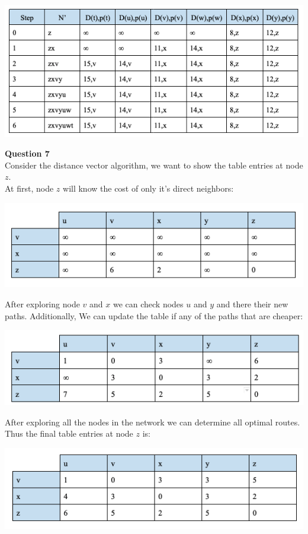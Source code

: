 \documentclass{article}
\begin{document}
\begin{center}
    \includegraphics[width=1\textwidth]{6-7.png}
\end{center}

{\bf Question 7}\\
Consider the distance vector algorithm, we want to show the table entries at node $z$.\\

At first, node $z$ will know the cost of only it's direct neighbors:
\begin{center}
    \includegraphics[width=1\textwidth]{7-1.png}
\end{center}

After exploring node $v$ and $x$ we can check nodes $u$ and $y$ and there their new paths. Additionally, We can update the table if any of the paths that are cheaper:
\begin{center}
    \includegraphics[width=1\textwidth]{7-2.png}
\end{center}

After exploring all the nodes in the network we can determine all optimal routes. Thus the final table entries at node $z$ is:
\begin{center}
    \includegraphics[width=1\textwidth]{7-3.png}
\end{center}
\end{document}
